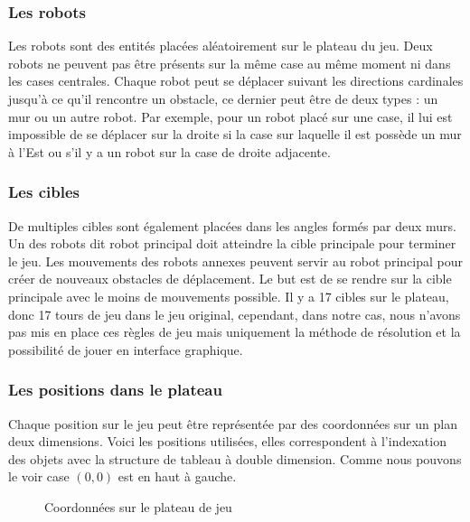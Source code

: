 \documentclass[a4paper]{article} %
\begin{document}
			\subsubsection{Les robots}
Les robots sont des entités placées aléatoirement sur le plateau du jeu. Deux robots ne peuvent pas être présents sur la même case au même moment ni dans les cases centrales. Chaque robot peut se déplacer suivant les directions cardinales jusqu'à ce qu'il rencontre un obstacle, ce dernier peut être de deux types : un mur ou un autre robot. Par exemple, pour un robot placé sur une case, il lui est impossible de se déplacer sur la droite si la case sur laquelle il est possède un mur à l'Est ou s'il y a un robot sur la case de droite adjacente. 

			\subsubsection{Les cibles}
De multiples cibles sont également placées dans les angles formés par deux murs. Un des robots dit robot principal doit atteindre la cible principale pour terminer le jeu. Les mouvements des robots annexes peuvent servir au robot principal pour créer de nouveaux obstacles de déplacement. Le but est de se rendre sur la cible principale avec le moins de mouvements possible.
Il y a 17 cibles sur le plateau, donc 17 tours de jeu dans le jeu original, cependant, dans notre cas, nous n'avons pas mis en place ces règles de jeu mais uniquement la méthode de résolution et la possibilité de jouer en interface graphique.%

			\subsubsection{Les positions dans le plateau}
Chaque position sur le jeu peut être représentée par des coordonnées sur un plan deux dimensions. Voici les positions utilisées, elles correspondent à l'indexation des objets avec la structure de tableau à double dimension. Comme nous pouvons le voir case $(0,0)$ est en haut à gauche.%
\pagebreak

\begin{figure}[htpb]
\centering
  \caption{Coordonnées sur le plateau de jeu}
\end{figure}
\end{document}
